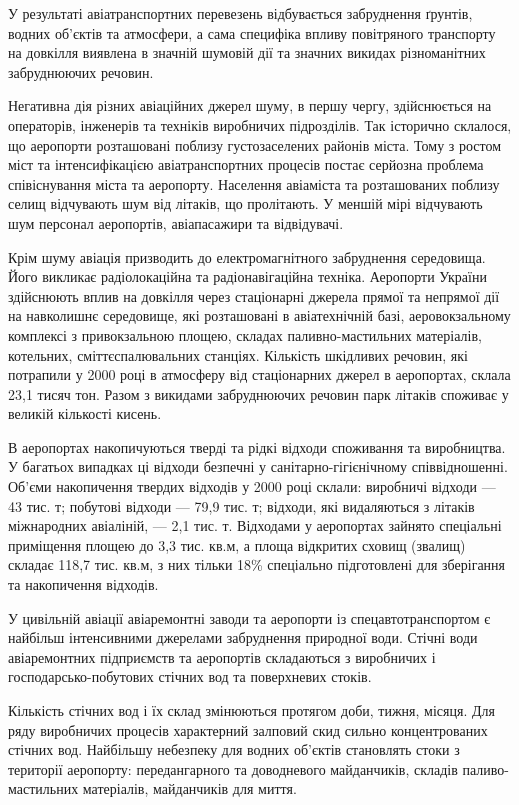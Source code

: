 У результаті авіатранспортних перевезень відбувається забруднення ґрунтів, водних об’єктів та атмосфери, 
а сама специфіка впливу повітряного транспорту на довкілля виявлена в значній шумовій дії та 
значних викидах різноманітних забруднюючих речовин.

Негативна дія різних авіаційних джерел шуму, в першу чергу, здійснюється на операторів, інженерів 
та техніків виробничих підрозділів. Так історично склалося, що аеропорти розташовані поблизу 
густозаселених районів міста. Тому з ростом міст та інтенсифікацією авіатранспортних процесів 
постає серйозна проблема співіснування міста та аеропорту. Населення авіаміста та розташованих 
поблизу селищ відчувають шум від літаків, що пролітають. У меншій мірі відчувають шум персонал 
аеропортів, авіапасажири та відвідувачі.

Крім шуму авіація призводить до електромагнітного забруднення середовища. Його викликає 
радіолокаційна та радіонавігаційна техніка. Аеропорти України здійснюють вплив на довкілля 
через стаціонарні джерела прямої та непрямої дії на навколишнє середовище, які розташовані в 
авіатехнічній базі, аеровокзальному комплексі з привокзальною площею, складах паливно-мастильних 
матеріалів, котельних, сміттєспалювальних станціях. Кількість шкідливих речовин, які потрапили у 
2000 році в атмосферу від стаціонарних джерел в аеропортах, склала 23,1 тисяч тон. Разом з викидами 
забруднюючих речовин парк літаків споживає у великій кількості кисень. 

В аеропортах накопичуються тверді та рідкі відходи споживання та виробництва. У багатьох випадках 
ці відходи безпечні у санітарно-гігієнічному співвідношенні. Об’єми накопичення твердих відходів 
у 2000 році склали: виробничі відходи --- 43 тис. т; побутові відходи --- 79,9 тис. т; відходи, 
які видаляються з літаків міжнародних авіаліній, --- 2,1 тис. т. Відходами у аеропортах зайнято 
спеціальні приміщення площею до 3,3 тис. кв.м, а площа відкритих сховищ (звалищ) складає 118,7 тис. кв.м, 
з них тільки 18\% спеціально підготовлені для зберігання та накопичення відходів.

У цивільній авіації авіаремонтні заводи та аеропорти із спецавтотранспортом є найбільш інтенсивними 
джерелами забруднення природної води. Стічні води авіаремонтних підприємств та аеропортів складаються 
з виробничих і господарсько-побутових стічних вод та поверхневих стоків. 

Кількість стічних вод і їх склад змінюються протягом доби, тижня, місяця. Для ряду виробничих 
процесів характерний залповий скид сильно концентрованих стічних вод. Найбільшу небезпеку для 
водних об’єктів становлять стоки з території аеропорту: передангарного та доводневого майданчиків, 
складів паливо-мастильних матеріалів, майданчиків для миття. 

